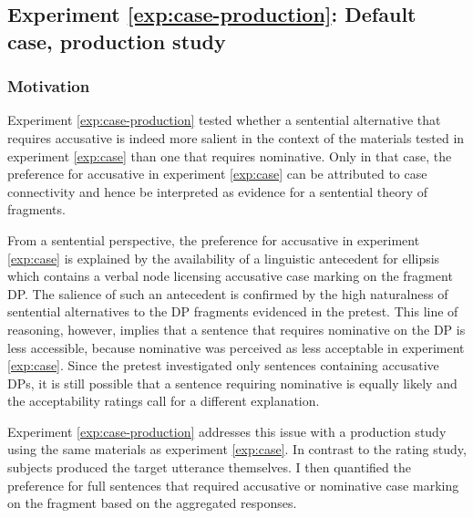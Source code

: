 \label{exp:case-production}
\subsection{Experiment \ref{exp:case-production}: Default case, production study}
\label{sec:fragments-case-followup}
\subsubsection{Motivation}

Experiment \ref{exp:case-production} tested whether a sentential alternative that requires accusative is indeed more salient in the context of the materials tested in experiment \ref{exp:case} than one that requires nominative. Only in that case, the preference for accusative in experiment \ref{exp:case} can be attributed to case connectivity and hence be interpreted as evidence for a sentential theory of fragments.

From a sentential perspective, the preference for accusative in experiment \ref{exp:case} is explained by the availability of a linguistic antecedent for ellipsis which contains a verbal node licensing accusative case marking on the fragment DP. The salience of such an antecedent is confirmed by the high naturalness of sentential alternatives to the DP fragments evidenced in the pretest. This line of reasoning, however, implies that a sentence that requires nominative on the DP is less accessible, because nominative was perceived as less acceptable in experiment \ref{exp:case}. Since the pretest investigated only sentences containing accusative DPs, it is still possible that a sentence requiring nominative is equally likely and the acceptability ratings call for a different explanation. 

Experiment \ref{exp:case-production} addresses this issue with a production study using the same materials as experiment \ref{exp:case}. In contrast to the rating study, subjects produced the target utterance themselves. I then quantified the preference for full sentences that required accusative or nominative case marking on the fragment based on the aggregated responses.

